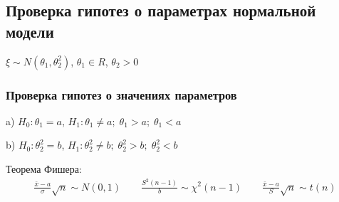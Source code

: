 \documentclass{article}
\begin{document}
\subsection{Проверка гипотез о параметрах нормальной модели}
$\xi \sim N(\theta_1, \theta_2^{2})$, $\theta_1 \in R$, $\theta_2 > 0$
\subsubsection{Проверка гипотез о значениях параметров}
a) $H_0: \theta_1=a$, $H_1: \theta_1 \neq a; \; \theta_1 > a; \; \theta_1 < a$

b) $H_0: \theta_2^{2}=b$, $H_1: \theta_2^{2} \neq b; \; \theta_2^{2} > b; \; \theta_2^{2} < b$

Теорема Фишера:
\begin{gather*}
  \frac{\bar{x}-a}{\sigma}\sqrt{n}\sim N(0,1)  \qquad \frac{S^{2}(n-1)}{b} \sim \chi^{2}(n-1) \qquad \frac{\bar{x}-a}{S}\sqrt{n}\sim t(n)
\end{gather*}
\end{document}
